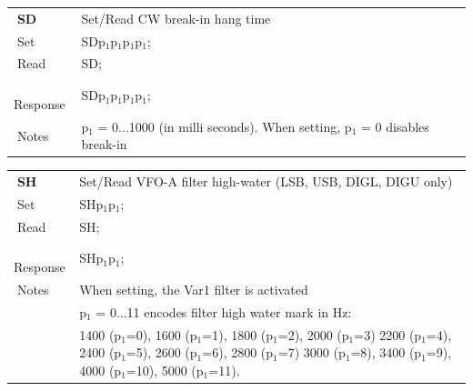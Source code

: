 \documentclass[12pt]{book}
\begin{document}
\begin{center}
\begin{tabular}{|p{2cm}|p{11cm}|}
\toprule
$\phantom{\Big|}$\textbf{\large SD} & Set/Read CW break-in hang time \\\cline{1-2}
$\phantom{\Big|}${\large Set} & {SDp$_1$p$_1$p$_1$p$_1$;} \\\hline
$\phantom{\Big|}${\large Read} & {SD;} \\\hline
$\phantom{\Big|}${\large Response} & {SDp$_1$p$_1$p$_1$p$_1$;} \\\hline
$\phantom{\Big|}${\large Notes} & \multicolumn{1}{|p{11cm}|}{p$_1$ = 0...1000 (in milli seconds). When setting, p$_1$ = 0  disables break-in} \\
\bottomrule
\end{tabular}
\end{center}

\begin{center}
\begin{tabular}{|p{2cm}|p{11cm}|}
\toprule
$\phantom{\Big|}$\textbf{\large SH} & Set/Read VFO-A filter high-water (LSB, USB, DIGL, DIGU only) \\\cline{1-2}
$\phantom{\Big|}${\large Set} & {SHp$_1$p$_1$;} \\\hline
$\phantom{\Big|}${\large Read} & {SH;} \\\hline
$\phantom{\Big|}${\large Response} & {SHp$_1$p$_1$;} \\\hline
$\phantom{\Big|}${\large Notes} & \multicolumn{1}{|p{11cm}|}{When setting, the Var1 filter is activated} \\
 & \multicolumn{1}{|p{11cm}|}{p$_1$ = 0...11 encodes filter high water mark in Hz:} \\
 & \multicolumn{1}{|p{11cm}|}{1400 (p$_1$=0), 1600 (p$_1$=1), 1800 (p$_1$=2), 2000 (p$_1$=3) 2200 (p$_1$=4), 2400 (p$_1$=5), 2600 (p$_1$=6), 2800 (p$_1$=7) 3000 (p$_1$=8), 3400 (p$_1$=9), 4000 (p$_1$=10), 5000 (p$_1$=11).} \\
\bottomrule
\end{tabular}
\end{center}
\end{document}
